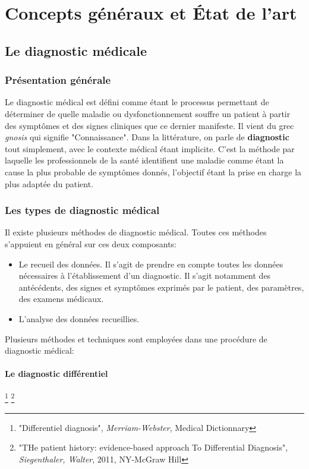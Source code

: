 
\chapter{Concepts généraux et État de l'art}
\label{chp:etat_art}


\section{Le diagnostic médicale}

\subsection{Présentation générale}
Le diagnostic médical est défini comme étant le processus permettant de déterminer de quelle maladie ou dysfonctionnement souffre un patient à partir des symptômes et des signes cliniques que ce dernier manifeste. Il vient du grec \textit{gnosis} qui signifie "Connaissance".
Dans la littérature, on parle de \textbf{diagnostic} tout simplement, avec le contexte médical étant implicite.
C'est la méthode par laquelle les professionnels de la santé identifient une maladie comme étant la cause la plus probable de symptômes donnés, l'objectif étant la prise en charge la plus adaptée du patient.


\subsection{Les types de diagnostic médical}
Il existe plusieurs méthodes de diagnostic médical. Toutes ces méthodes s'appuient en général sur ces deux composants:
\begin{itemize}
    \item Le recueil des données. Il s'agit de prendre en compte toutes les données nécessaires à l'établissement d'un diagnostic. Il s'agit notamment des antécédents, des signes et symptômes exprimés par le patient, des paramètres, des examens médicaux.
    \item L'analyse des données recueillies.
\end{itemize}

Plusieurs méthodes et techniques sont employées dans une procédure de diagnostic médical:

\subsubsection{Le diagnostic différentiel} \footnote{"Differentiel diagnosis", \textit{Merriam-Webster}, Medical Dictionnary} \footnote{"THe patient history: evidence-based approach To Differential Diagnosis", \textit{Siegenthaler, Walter}, 2011, NY-McGraw Hill}

